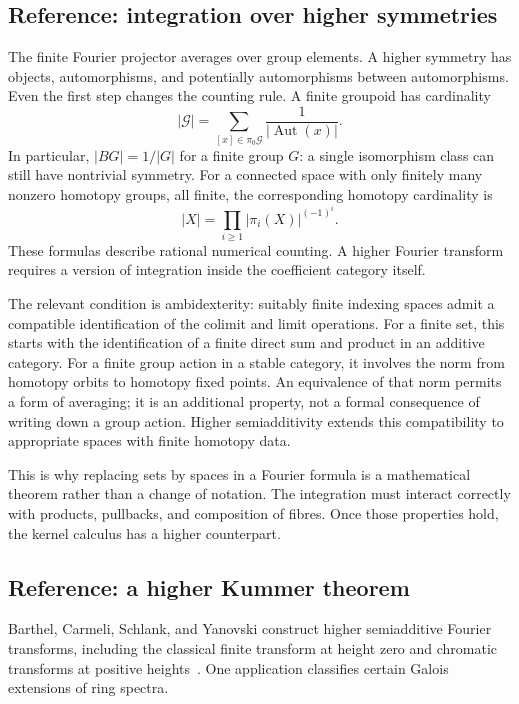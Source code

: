 \documentclass[11pt]{article}
\theoremstyle{remark}
\begin{document}
\subsection{Reference: integration over higher symmetries}

The finite Fourier projector averages over group elements. A higher symmetry has objects, automorphisms, and potentially automorphisms between automorphisms. Even the first step changes the counting rule. A finite groupoid has cardinality
\[
|\mathcal G|=\sum_{[x]\in\pi_0\mathcal G}
\frac{1}{|\operatorname{Aut}(x)|}.
\]
In particular, \(|BG|=1/|G|\) for a finite group \(G\): a single isomorphism class can still have nontrivial symmetry. For a connected space with only finitely many nonzero homotopy groups, all finite, the corresponding homotopy cardinality is
\[
|X|=\prod_{i\geq1}|\pi_i(X)|^{(-1)^i}.
\]
These formulas describe rational numerical counting. A higher Fourier transform requires a version of integration inside the coefficient category itself.

The relevant condition is ambidexterity: suitably finite indexing spaces admit a compatible identification of the colimit and limit operations. For a finite set, this starts with the identification of a finite direct sum and product in an additive category. For a finite group action in a stable category, it involves the norm from homotopy orbits to homotopy fixed points. An equivalence of that norm permits a form of averaging; it is an additional property, not a formal consequence of writing down a group action. Higher semiadditivity extends this compatibility to appropriate spaces with finite homotopy data.

This is why replacing sets by spaces in a Fourier formula is a mathematical theorem rather than a change of notation. The integration must interact correctly with products, pullbacks, and composition of fibres. Once those properties hold, the kernel calculus has a higher counterpart.

\subsection{Reference: a higher Kummer theorem}

Barthel, Carmeli, Schlank, and Yanovski construct higher semiadditive Fourier transforms, including the classical finite transform at height zero and chromatic transforms at positive heights~\cite{chromatic}. One application classifies certain Galois extensions of ring spectra.
\end{document}
